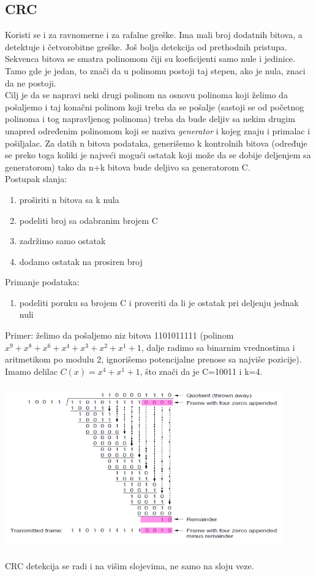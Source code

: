 \documentclass{article} %
\begin{document}
\subsection{CRC}
Koristi se i za ravnomerne i za rafalne greške. Ima mali broj dodatnih bitova, a detektuje i četvorobitne greške. Još bolja detekcija od prethodnih pristupa. \\
Sekvenca bitova se smatra polinomom čiji su koeficijenti samo nule i jedinice. Tamo gde je jedan, to znači da u polinomu postoji taj stepen, ako je nula, znaci da ne postoji.\\
Cilj je da se napravi neki drugi polinom na osnovu polinoma koji želimo da pošaljemo i taj konačni polinom koji treba da se pošalje (sastoji se od početnog polinoma i tog napravljenog polinoma) treba da bude deljiv sa nekim drugim unapred određenim polinomom koji se naziva \textit{generator} i kojeg znaju i primalac i pošiljalac. Za datih n bitova podataka, generišemo k kontrolnih bitova (određuje se preko toga koliki je najveći mogući ostatak koji može da se dobije deljenjem sa generatorom) tako da n+k bitova bude deljivo sa generatorom C.\\
Postupak slanja: 
\begin{enumerate}
\item proširiti n bitova sa k nula
\item podeliti broj sa odabranim brojem C
\item zadržimo samo ostatak 
\item dodamo ostatak na prosiren broj
\end{enumerate}
Primanje podataka:
\begin{enumerate}
\item podeliti poruku sa brojem C i proveriti da li je ostatak pri deljenju jednak nuli
\end{enumerate}
Primer: želimo da pošaljemo niz bitova 1101011111 (polinom $ x^{9}+x^{8}+x^{6}+x^{4}+x^{3}+x^{2}+x^{1}+1 $, dalje radimo sa binarnim vrednostima i aritmetikom po modulu 2, ignorišemo potencijalne prenose sa najviše pozicije). Imamo delilac $C(x)= x^{4} + x^{1} + 1 $, što znači da je C=10011 i k=4.
\begin{center}
\includegraphics[width=12cm, height=7cm]{crc}\\
\end{center}
CRC detekcija se radi i na višim slojevima, ne samo na sloju veze.
\end{document}
